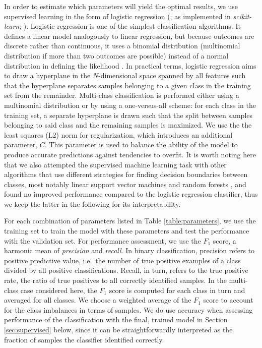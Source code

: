 \documentclass[fleqn,usenatbib]{mnras}
\begin{document}
In order to estimate which parameters will yield the optimal results, we use supervised learning in the form of logistic regression (\citealt{cox1958}; as implemented in \textit{scikit-learn}; \citealt{scikit-learn}). Logistic regression is one of the simplest classification algorithms. It defines a linear model analogously to linear regression, but because outcomes are discrete rather than continuous, it uses a binomial distribution (multinomial distribution if more than two outcomes are possible) instead of a normal distribution in defining the likelihood \citep{cox1958}. In practical terms, logistic regression aims to draw a hyperplane in the $N$-dimensional space spanned by all features such that the hyperplane separates samples belonging to a given class in the training set from the remainder. Multi-class classification is performed either using a multinomial distribution or by using a one-versus-all scheme: for each class in the training set, a separate hyperplane is drawn such that the split between samples belonging to said class and the remaining samples is maximized. We use the the least squares (L2) norm for regularization, which introduces an additional parameter, $C$. This parameter is used to balance the ability of the model to produce accurate predictions against tendencies to overfit. It is worth noting here that we also attempted the supervised machine learning task with other algorithms that use different strategies for finding decision boundaries between classes, most notably linear support vector machines \citep{guyon1993,cortes1995} and random forests \citep{breiman2001}, and found no improved performance compared to the logistic regression classifier, thus we keep the latter in the following for its interpretability.

For each combination of parameters listed in Table \ref{table:parameters}, we use the training set to train the model with these parameters and test the performance with the validation set. For performance assessment, we use the $F_1$ score, a harmonic mean of \textit{precision} and \textit{recall}. In binary classification, precision refers to positive predictive value, i.e.\ the number of true positive examples of a class divided by all positive classifications. Recall, in turn, refers to the true positive rate, the ratio of true positives to all correctly identified samples. In the multi-class case considered here, the $F_1$ score is computed for each class in turn and averaged for all classes. We choose a weighted average of the $F_1$ score to account for the class imbalances in terms of samples.
We do use accuracy when assessing performance of the classification with the final, trained model in Section \ref{sec:supervised} below, since it can be straightforwardly interpreted as the fraction of samples the classifier identified correctly.
\end{document}
